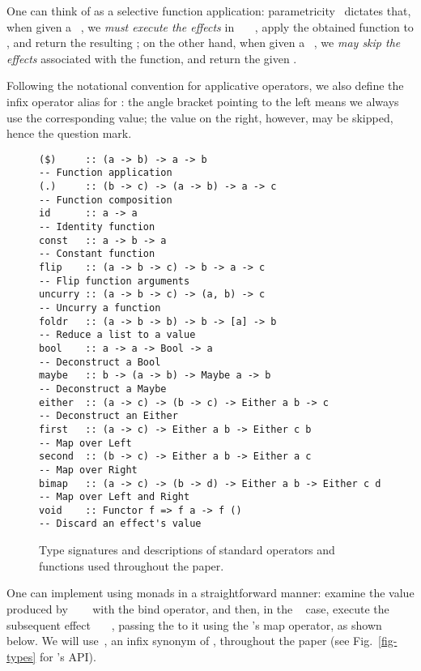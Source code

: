 \noindent
One can think of  as a selective function application:
parametricity~\citep{wadler1989theorems} dictates that, when given a
~, we \emph{must execute the effects} in
~\hs{(}~\hs{->}~, apply the obtained function to , and
return the resulting ; on the other hand, when given a ~,
we \emph{may skip the effects} associated with the function, and return the
given .

Following the notational convention for applicative operators, we also define
the infix operator alias  for : the angle bracket pointing to
the left means we always use the corresponding value; the value on the right,
however, may be skipped, hence the question mark.

\begin{figure}
\begin{verbatim}
($)     :: (a -> b) -> a -> b                               -- Function application
(.)     :: (b -> c) -> (a -> b) -> a -> c                   -- Function composition
id      :: a -> a                                           -- Identity function
const   :: a -> b -> a                                      -- Constant function
flip    :: (a -> b -> c) -> b -> a -> c                     -- Flip function arguments
uncurry :: (a -> b -> c) -> (a, b) -> c                     -- Uncurry a function
foldr   :: (a -> b -> b) -> b -> [a] -> b                   -- Reduce a list to a value
bool    :: a -> a -> Bool -> a                              -- Deconstruct a Bool
maybe   :: b -> (a -> b) -> Maybe a -> b                    -- Deconstruct a Maybe
either  :: (a -> c) -> (b -> c) -> Either a b -> c          -- Deconstruct an Either
first   :: (a -> c) -> Either a b -> Either c b             -- Map over Left
second  :: (b -> c) -> Either a b -> Either a c             -- Map over Right
bimap   :: (a -> c) -> (b -> d) -> Either a b -> Either c d -- Map over Left and Right
void    :: Functor f => f a -> f ()                         -- Discard an effect's value
\end{verbatim}
\caption{Type signatures and descriptions of standard operators and functions
used throughout the paper.}\label{fig-std}
\end{figure}

One can implement  using monads in a straightforward manner: examine
the value produced by ~~~ with the bind operator,
and then, in the ~ case, execute the subsequent effect
~~\hs{->}~, passing the  to it using the
's map operator, as shown below. We will use~, an
infix synonym of , throughout the paper (see Fig.~\ref{fig-types} for
's API).

